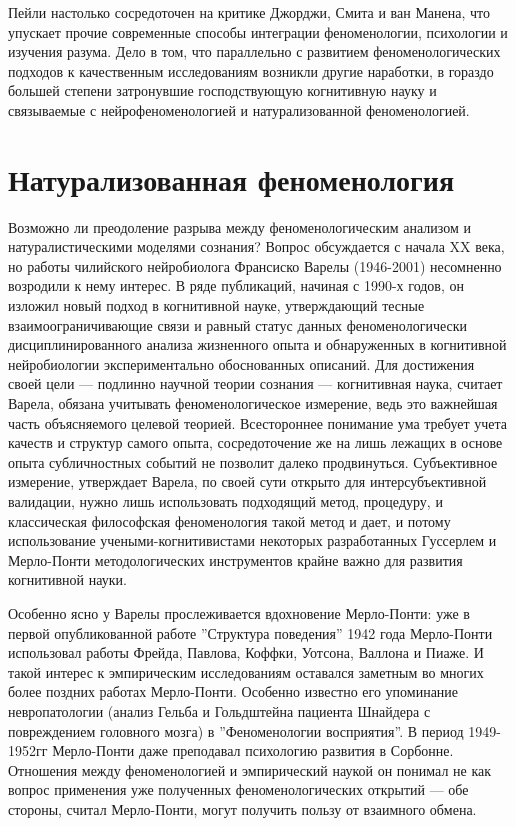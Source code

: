 \documentclass[11pt]{book}
\begin{document}
Пейли настолько сосредоточен на критике Джорджи, Смита и ван Манена, что упускает прочие современные способы интеграции феноменологии, психологии и изучения разума. Дело в том, что параллельно с развитием феноменологических подходов к качественным исследованиям возникли другие наработки, в гораздо большей степени затронувшие господствующую когнитивную науку и связываемые с нейрофеноменологией и натурализованной феноменологией.

\section{Натурализованная феноменология}

Возможно ли преодоление разрыва между феноменологическим анализом и натуралистическими моделями сознания? Вопрос обсуждается с начала XX века, но работы чилийского нейробиолога Франсиско Варелы (1946-2001) несомненно возродили к нему интерес. В ряде публикаций, начиная с 1990-х годов, он изложил новый подход в когнитивной науке, утверждающий тесные взаимоограничивающие связи и равный статус данных феноменологически дисциплинированного анализа жизненного опыта и обнаруженных в когнитивной нейробиологии экспериментально обоснованных описаний. Для достижения своей цели --- подлинно научной теории сознания --- когнитивная наука, считает Варела, обязана учитывать феноменологическое измерение, ведь это важнейшая часть объясняемого целевой теорией. Всестороннее понимание ума требует учета качеств и структур самого опыта, сосредоточение же на лишь лежащих в основе опыта субличностных событий не позволит далеко продвинуться. Субъективное измерение, утверждает Варела, по своей сути открыто для интерсубъективной валидации, нужно лишь использовать подходящий метод, процедуру, и классическая философская феноменология такой метод и дает, и потому использование учеными-когнитивистами некоторых разработанных Гуссерлем и Мерло-Понти методологических инструментов крайне важно для развития когнитивной науки.

Особенно ясно у Варелы прослеживается вдохновение Мерло-Понти: уже в первой опубликованной работе ''Структура поведения'' 1942 года Мерло-Понти использовал работы Фрейда, Павлова, Коффки, Уотсона, Валлона и Пиаже. И такой интерес к эмпирическим исследованиям оставался заметным во многих более поздних работах Мерло-Понти. Особенно известно его упоминание невропатологии (анализ Гельба и Гольдштейна пациента Шнайдера с повреждением головного мозга) в ''Феноменологии восприятия''. В период 1949-1952гг Мерло-Понти даже преподавал психологию развития в Сорбонне. Отношения между феноменологией и эмпирический наукой он понимал не как вопрос применения уже полученных феноменологических открытий --- обе стороны, считал Мерло-Понти, могут получить пользу от взаимного обмена.
\end{document}
